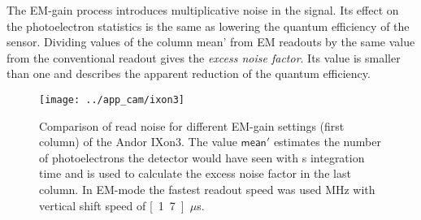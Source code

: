 The EM-gain process introduces multiplicative noise in the signal. Its
effect on the photoelectron statistics is the same as lowering the
quantum efficiency of the sensor. Dividing values of the column
\textsf{ mean'} from EM readouts by the same value from the
conventional readout gives the \emph{excess noise factor}. Its value is smaller than one and
describes the apparent reduction of the quantum efficiency.




\begin{figure}
  \centering
  \texttt{[image: ../app\_cam/ixon3]}
  \caption{Comparison of read noise for different EM-gain settings
    (first column) of the Andor IXon3. The value $\textsf{mean}'$
    estimates the number of photoelectrons the detector would have
    seen with \unit[1]{s} integration time and is used to calculate
    the excess noise factor in the last column. In EM-mode the fastest
    readout speed was used \unit[10]{MHz} with vertical shift speed of
    \unit[1.7]{$\mu$s}.}
  \label{fig:ixon-table}
\end{figure}


